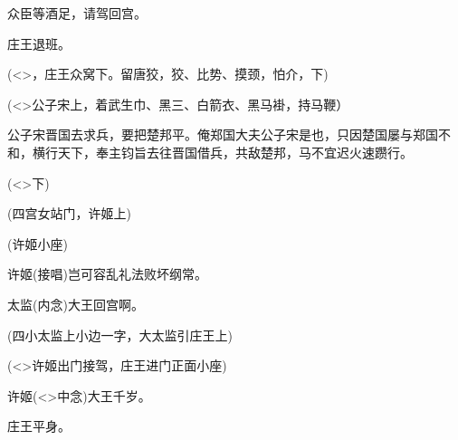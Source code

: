 {众\hspace{40pt}臣等酒足，请驾回宫。

庄王\hspace{30pt}退班。

(\textless{}\!\textgreater{}，庄王众{\hwfs 窝下}。{\hwfs 留}唐狡，狡、{\hwfs 比势}、{\hwfs 摸颈}，{\hwfs 怕介}，{\hwfs 下})

\vspace{5pt}

(\textless{}\!\textgreater{}公子宋{\hwfs 上}，{\hwfs 着}武生巾、黑三、白箭衣、黑马褂，持马鞭）

公子宋\hspace{20pt}晋国去求兵，要把楚邦平。俺郑国大夫公子宋是也，只因楚国屡与郑国不和，横行天下，奉主钧旨去往晋国借兵，共敌楚邦，马不宜迟火速躜行。

(\textless{}\!\textgreater{}{\hwfs 下})

\vspace{5pt}

({\hwfs 四}宫女{\hwfs 站门}，许姬{\hwfs 上})


(许姬{\hwfs 小座})

许姬\hspace{30pt}({\akai 接唱})岂可容乱礼法败坏纲常。

太监\hspace{30pt}({\akai 内念})大王回宫啊。

({\hwfs 四}小太监{\hwfs 上小边一字}，大太监{\hwfs 引}庄王{\hwfs 上})


(\textless{}\!\textgreater{}许姬{\hwfs 出门接驾}，庄王{\hwfs 进门正面小座})

许姬\hspace{30pt}(\textless{}\!\textgreater{}{\hwfs 中}{\akai 念})大王千岁。

庄王\hspace{30pt}平身。

}

